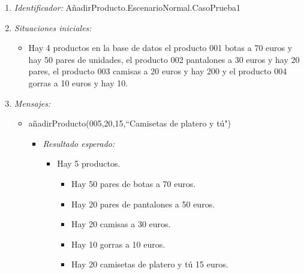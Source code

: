 \begin{enumerate}
\item {\it Identificador:} AñadirProducto.EscenarioNormal.CasoPrueba1
\item {\it Situaciones iniciales:}
  \begin{itemize}
  \item Hay 4 productos en la base de datos el producto 001 botas a 70 euros y hay 50 pares de unidades, el producto 002 pantalones a 30 euros y hay 20 pares, el producto 003 camisas a 20 euros y hay 200 y el producto 004 gorras a 10 euros y hay 10.
  \end{itemize}
\item {\it Mensajes:}
  \begin{itemize}
  \item añadirProducto(005,20,15,``Camisetas de platero y tú")
    \begin{itemize}
    \item {\it Resultado esperado:}
      \begin{itemize}
      \item Hay 5 productos.
        \begin{itemize}
        \item Hay 50 pares de botas a 70 euros.
        \item Hay 20 pares de pantalones a 50 euros.
        \item Hay 20 camisas a 30 euros.
        \item Hay 10 gorras a 10 euros.
        \item Hay 20 camisetas de platero y tú 15 euros.
        \end{itemize}
      \end{itemize}
    \end{itemize}
  \end{itemize}


\end{enumerate}

